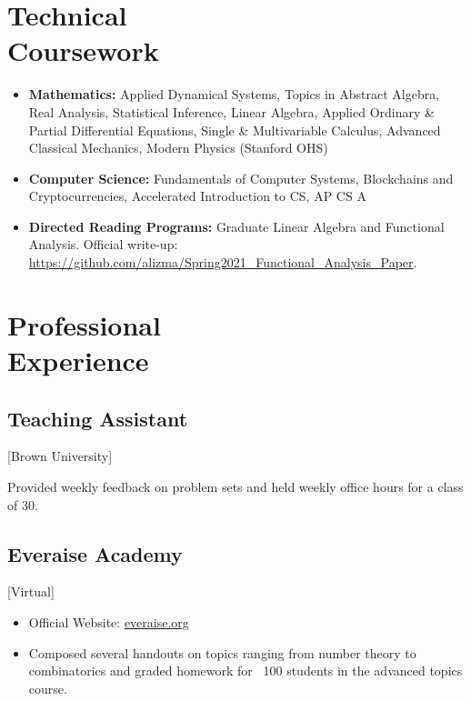 \documentclass{mycv}
\begin{document}
\maketitle%

\section{Technical \\ Coursework}

\begin{itemize}
    \item \textbf{Mathematics:} Applied Dynamical Systems, Topics in Abstract Algebra, Real Analysis, Statistical Inference, Linear Algebra, Applied Ordinary \& Partial Differential Equations, Single \& Multivariable Calculus, Advanced Classical Mechanics, Modern Physics (Stanford OHS)
    \item \textbf{Computer Science:} Fundamentals of Computer Systems, Blockchains and Cryptocurrencies, Accelerated Introduction to CS, AP CS A 
    \item \textbf{Directed Reading Programs:} Graduate Linear Algebra and Functional Analysis. Official write-up: \url{https://github.com/alizma/Spring2021_Functional_Analysis_Paper}.
\end{itemize}

\section{Professional \\ Experience}

\subsection{Teaching Assistant}[Brown University]
\begin{positions}
\end{positions}
Provided weekly feedback on problem sets and held weekly office hours for a class of 30. 

\subsection{Everaise Academy}[Virtual]
\begin{positions}
\end{positions}

\begin{itemize}
  \item Official Website: \href{everaise.org}{everaise.org}
  \item Composed several handouts on topics ranging from number theory to combinatorics and graded homework for ~100 students in the advanced topics course.
\end{itemize}
\end{document}

